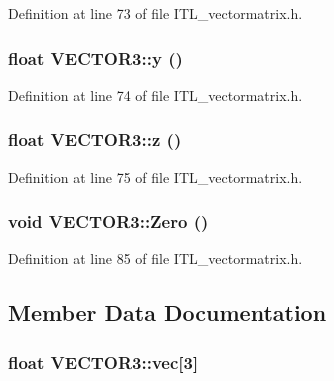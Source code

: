 Definition at line 73 of file ITL\_\-vectormatrix.h.

\hypertarget{classVECTOR3_aa6d52065fe15476ad2f169f93e8e4539}{
\subsubsection[{y}]{\setlength{\rightskip}{0pt plus 5cm}float VECTOR3::y ()}}
\label{classVECTOR3_aa6d52065fe15476ad2f169f93e8e4539}


Definition at line 74 of file ITL\_\-vectormatrix.h.

\hypertarget{classVECTOR3_a8962966f79d06da320d958555cd7c98e}{
\subsubsection[{z}]{\setlength{\rightskip}{0pt plus 5cm}float VECTOR3::z ()}}
\label{classVECTOR3_a8962966f79d06da320d958555cd7c98e}


Definition at line 75 of file ITL\_\-vectormatrix.h.

\hypertarget{classVECTOR3_a55e86265b134a80232d1fb4f8857d3e2}{
\subsubsection[{Zero}]{\setlength{\rightskip}{0pt plus 5cm}void VECTOR3::Zero ()}}
\label{classVECTOR3_a55e86265b134a80232d1fb4f8857d3e2}


Definition at line 85 of file ITL\_\-vectormatrix.h.



\subsection{Member Data Documentation}
\hypertarget{classVECTOR3_a6550870fd8405ddc131bdb4643940fcd}{
\subsubsection[{vec}]{\setlength{\rightskip}{0pt plus 5cm}float {\bf VECTOR3::vec}\mbox{[}3\mbox{]}}}
\label{classVECTOR3_a6550870fd8405ddc131bdb4643940fcd}


